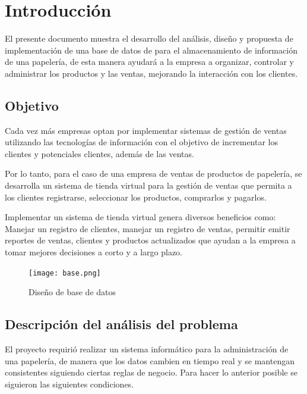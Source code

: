 \documentclass[30pt,fleqn]{article}
\begin{document}
\maketitle 

\section{Introducción}
\vspace{5mm} %
El presente documento muestra el desarrollo del análisis, diseño y propuesta de implementación de una base de datos de para el almacenamiento de información de una papelería, de esta manera ayudará a la empresa a organizar, controlar y administrar los productos y las ventas, mejorando la interacción con los clientes. 


\subsection{Objetivo}
\vspace{5mm} %
Cada vez más empresas optan por implementar sistemas de gestión de ventas utilizando las tecnologías de información con el objetivo de incrementar los clientes y potenciales clientes, además de las ventas.

Por lo tanto, para el caso de una empresa de ventas de productos de papelería, se desarrolla un sistema de tienda virtual para la gestión de ventas que permita a los clientes registrarse, seleccionar los productos, comprarlos y pagarlos.

Implementar un sistema de tienda virtual genera diversos beneficios como: Manejar un registro de clientes, manejar un registro de ventas, permitir emitir reportes de ventas, clientes y productos actualizados que ayudan a la empresa a tomar mejores decisiones a corto y a largo plazo. 


\begin{figure}[h]
    \centering
    \texttt{[image: base.png]}\hspace{1cm}
    \caption{Diseño de base de datos}
    \label{fig:Database}
\end{figure}
\vspace{10mm} %
 
\subsection{Descripción del análisis del problema}
\vspace{5mm} %
El proyecto requirió realizar un sistema informático para la administración de una papelería, de manera que los datos cambien en tiempo real y se mantengan consistentes siguiendo ciertas reglas de negocio. Para hacer lo anterior posible se siguieron las siguientes condiciones.
\vspace{5mm} %
\end{document}

